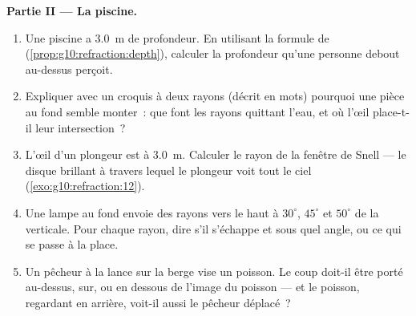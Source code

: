 \begin{problem}
\medskip
\noindent\textbf{Partie II --- La piscine.}
\begin{enumerate}[resume]
  \item Une piscine a \qty{3.0}{m} de profondeur. En utilisant la
        formule de 
        (\cref{prop:g10:refraction:depth}), calculer la profondeur qu'une
        personne debout au-dessus perçoit.
  \item Expliquer avec un croquis à deux rayons (décrit en mots)
        pourquoi une pièce au fond semble monter~: que font les rayons
        quittant l'eau, et où l'œil place-t-il leur intersection~?
  \item L'œil d'un plongeur est à \qty{3.0}{m}. Calculer le rayon de la
        fenêtre de Snell --- le disque brillant à travers lequel le
        plongeur voit tout le ciel (\cref{exo:g10:refraction:12}).
  \item Une lampe au fond envoie des rayons vers le haut à $30^\circ$,
        $45^\circ$ et $50^\circ$ de la verticale. Pour chaque rayon,
        dire s'il s'échappe et sous quel angle, ou ce qui se passe à la
        place.
  \item Un pêcheur à la lance sur la berge vise un poisson. Le coup
        doit-il être porté au-dessus, sur, ou en dessous de l'image du
        poisson --- et le poisson, regardant en arrière, voit-il aussi
        le pêcheur déplacé~?
\end{enumerate}


\end{problem}
